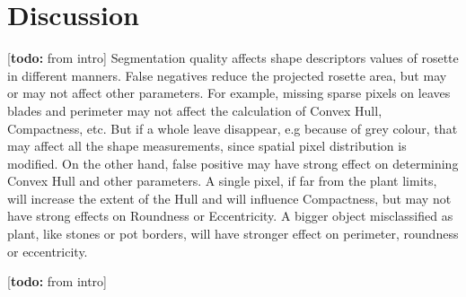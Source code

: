 \documentclass{frontiersSCNS} %
\newcommand{\todo}[1]{
  \rule{0pt}{0pt}\marginpar{{\color{blue}\rule{1ex}{1ex}}}
  {[\textbf{\color{blue}todo:} #1]}}
\begin{document}
\section{Discussion}

\todo{from intro}
Segmentation quality affects shape descriptors values of rosette in different manners. False negatives reduce the projected rosette area, but may or may not affect other parameters. For example, missing sparse pixels on leaves blades and perimeter may not affect the calculation of Convex Hull, Compactness, etc. But if a whole leave disappear, e.g because of grey colour, that may affect all the shape measurements, since spatial pixel distribution is modified. On the other hand, false positive may have strong effect on determining Convex Hull and other parameters. A single pixel, if far from the plant limits, will increase the extent of the Hull and will influence Compactness, but may not have strong effects on Roundness or Eccentricity. A bigger object misclassified as plant, like stones or pot borders, will have stronger effect on perimeter, roundness or eccentricity.
\todo{from intro}
\end{document}
